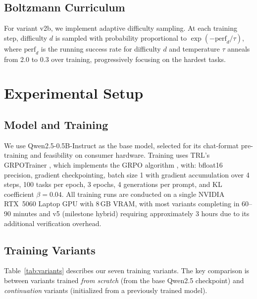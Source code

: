 \documentclass[11pt]{article}
\begin{document}
\subsection{Boltzmann Curriculum}
\label{sec:curriculum}

For variant v2b, we implement adaptive difficulty sampling.
At each training step, difficulty $d$ is sampled with probability proportional to $\exp(-\text{perf}_d / \tau)$, where $\text{perf}_d$ is the running success rate for difficulty $d$ and temperature $\tau$ anneals from 2.0 to 0.3 over training, progressively focusing on the hardest tasks.


\section{Experimental Setup}
\label{sec:setup}

\subsection{Model and Training}

We use Qwen2.5-0.5B-Instruct \citep{qwen2025qwen25} as the base model, selected for its chat-format pre-training and feasibility on consumer hardware.
Training uses TRL's GRPOTrainer \citep{trl2024}, which implements the GRPO algorithm \citep{shao2024deepseekmath,deepseek2025r1}, with: bfloat16 precision, gradient checkpointing, batch size 1 with gradient accumulation over 4 steps, 100 tasks per epoch, 3 epochs, 4 generations per prompt, and KL coefficient $\beta = 0.04$.
All training runs are conducted on a single NVIDIA RTX~5060 Laptop GPU with 8\,GB VRAM, with most variants completing in 60--90 minutes and v5 (milestone hybrid) requiring approximately 3 hours due to its additional verification overhead.

\subsection{Training Variants}

Table~\ref{tab:variants} describes our seven training variants.
The key comparison is between variants trained \emph{from scratch} (from the base Qwen2.5 checkpoint) and \emph{continuation} variants (initialized from a previously trained model).
\end{document}
